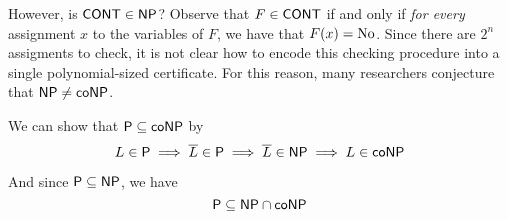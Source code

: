 However, is $\mathsf{CONT}\in\mathsf{NP}$? Observe that $F\in\mathsf{CONT}$ if and only if
\textit{for every} assignment $x$ to the variables of $F$, we have
that $F(x)=\text{No}$. Since there are $2^n$ assigments to check, it is not
clear how to encode this checking procedure into a single
polynomial-sized certificate. For this reason, many researchers
conjecture that $\mathsf{NP}\neq\mathsf{coNP}$.

\label{e6ea03d}

We can show that $\mathsf{P}\subseteq\mathsf{coNP}$ by
$$L\in\mathsf{P}\implies\overline L\in\mathsf{P}\implies\overline L\in\mathsf{NP}\implies L\in\mathsf{coNP}$$

And since $\mathsf{P}\subseteq\mathsf{NP}$, we have
$$\mathsf{P}\subseteq\mathsf{NP}\cap\mathsf{coNP}$$

